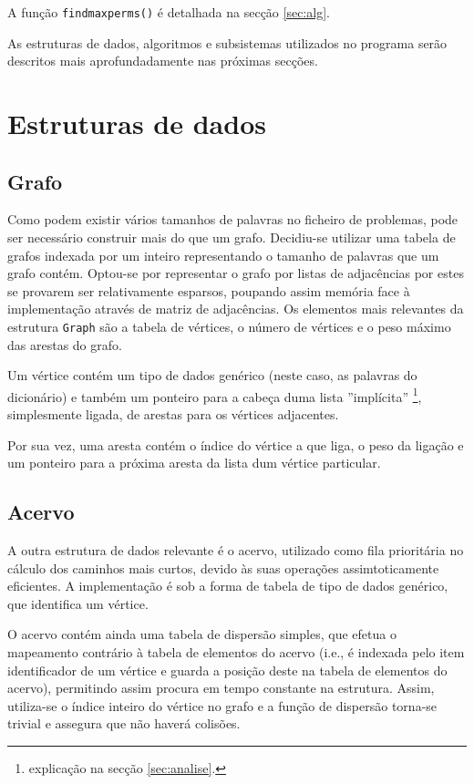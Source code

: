 \documentclass[portuguese, a4paper]{article}
\newcommand\tu[0]{\textunderscore}
\begin{document}
	\par
	A função \texttt{find\tu max\tu perms()} é detalhada na secção
	\ref{sec:alg}.
	\par
	As estruturas de dados, algoritmos e subsistemas utilizados no programa
	serão descritos mais aprofundadamente nas próximas secções.

\section{Estruturas de dados}
	\subsection{Grafo}
	\par
	Como podem existir vários tamanhos de palavras no ficheiro de problemas,
	pode ser necessário construir mais do que um grafo. Decidiu-se utilizar uma
	tabela de grafos indexada por um inteiro representando o tamanho de palavras
	que um grafo contém. Optou-se por representar o grafo por listas de
	adjacências por estes se provarem ser relativamente esparsos, poupando assim
	memória face à implementação através de matriz de adjacências. Os elementos
	mais relevantes da estrutura \texttt{Graph} são a tabela de vértices, o
	número de vértices e o peso máximo das arestas do grafo.
	\par
	Um vértice contém um tipo de dados genérico (neste caso, as palavras do
	dicionário) e também um ponteiro para a cabeça duma lista ''implícita''
	\footnote{explicação na secção \ref{sec:analise}.}, simplesmente ligada, de
	arestas para os vértices adjacentes.
	\par
	Por sua vez, uma aresta contém o índice do vértice a que liga, o peso da
	ligação e um ponteiro para a próxima aresta da lista dum vértice
	particular.

	\subsection{Acervo}
	\par\null\par
	A outra estrutura de dados relevante é o acervo, utilizado como fila
	prioritária no cálculo dos caminhos mais curtos, devido às suas operações
	assimtoticamente eficientes. A implementação é sob a forma de tabela de tipo
	de dados genérico, que identifica um vértice.
	\par
	O acervo contém ainda uma tabela de dispersão simples, que efetua o
	mapeamento contrário à tabela de elementos do acervo (i.e., é indexada pelo
	item identificador de um vértice e guarda a posição deste na tabela de
	elementos do acervo), permitindo assim procura em tempo constante na
	estrutura. Assim, utiliza-se o índice inteiro do vértice no grafo e a função
	de dispersão torna-se trivial e assegura que não haverá colisões.
\end{document}
